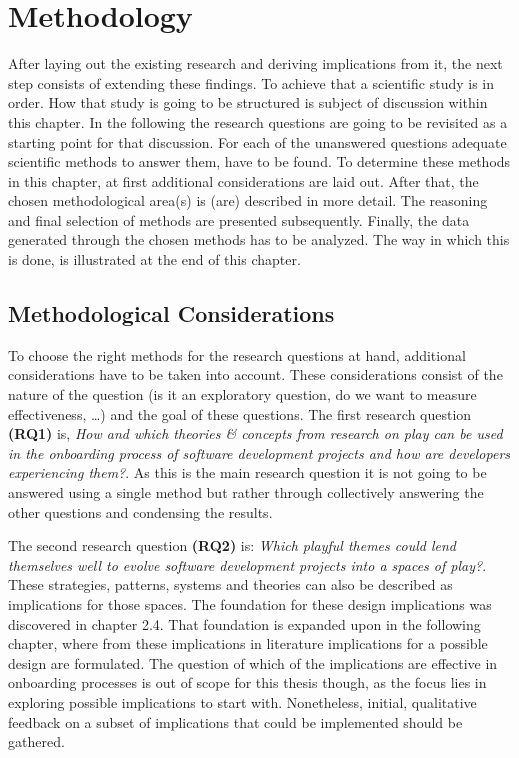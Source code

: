 \section{Methodology}

After laying out the existing research and deriving implications from it, the next step consists of extending these findings. To achieve that a scientific study is in order. How that study is going to be structured is subject of discussion within this chapter. In the following the research questions are going to be revisited as a starting point for that discussion. For each of the unanswered questions adequate scientific methods to answer them, have to be found. To determine these methods in this chapter, at first additional considerations are laid out. After that, the chosen methodological area(s) is (are) described in more detail. The reasoning and final selection of methods are presented subsequently. Finally, the data generated through the chosen methods has to be analyzed. The way in which this is done, is illustrated at the end of this chapter.

\subsection{Methodological Considerations}

To choose the right methods for the research questions at hand, additional considerations have to be taken into account. These considerations consist of the nature of the question (is it an exploratory question, do we want to measure effectiveness, \ldots) and the goal of these questions. The first research question \textbf{(RQ1)} is, \textit{How and which theories \& concepts from research on play can be used in the onboarding process of software development projects and how are developers experiencing them?}. As this is the main research question it is not going to be answered using a single method but rather through collectively answering the other questions and condensing the results.

The second research question \textbf{(RQ2)} is: \textit{Which playful themes could lend themselves well to evolve software development projects into a spaces of play?}. These strategies, patterns, systems and theories can also be described as implications for those spaces. The foundation for these design implications was discovered in chapter 2.4. That foundation is expanded upon in the following chapter, where from these implications in literature implications for a possible design are formulated. The question of which of the implications are effective in onboarding processes is out of scope for this thesis though, as the focus lies in exploring possible implications to start with. Nonetheless, initial, qualitative feedback on a subset of implications that could be implemented should be gathered.

